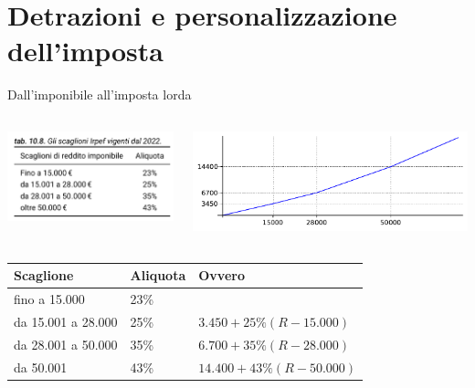 \documentclass[aspectratio=64,11pt]{beamer}
\newcommand\€{\,\text{€}}
\begin{document}
\section{Detrazioni e personalizzazione dell'imposta}


\begin{frame}{Dall'imponibile all'imposta lorda}

  \begin{columns}
    \begin{column}{.35\textwidth}
\centering
\includegraphics[height=2.7cm]{./figure/scaglioni-IRPEF-2022.png}
\end{column}
\begin{column}{.65\textwidth}
\centering
\includegraphics[height=3cm]{./figure/scaglioni-2022-grafico.pdf}
\end{column}
\end{columns}

\small
\begin{tabular}{lll}
Scaglione & Aliquota & Ovvero\\[0pt]
\hline
fino a 15.000 & 23\% & \\[0pt]
da 15.001 a 28.000 & 25\% & $3.450 + 25\% (R - 15.000)$\\[0pt]
da 28.001 a 50.000 & 35\% & $6.700 + 35\% (R - 28.000)$\\[0pt]
da 50.001 & 43\% & $14.400 + 43\% (R - 50.000)$\\[0pt]
\end{tabular}
\end{frame}
\end{document}
